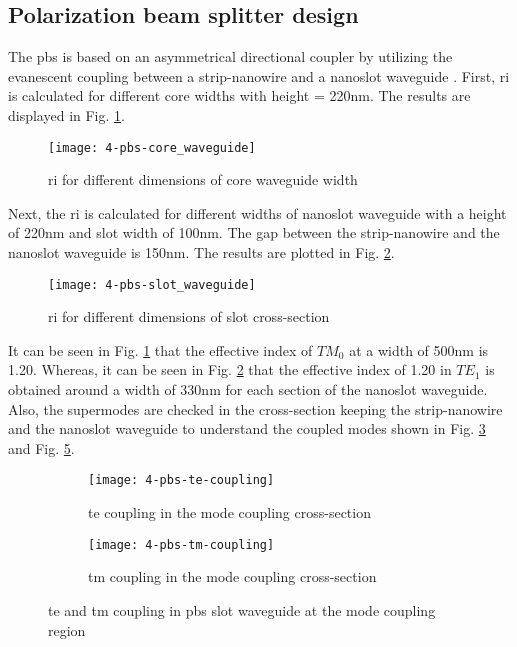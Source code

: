 \documentclass[../report.tex]{subfiles}
\begin{document}
\subsection{Polarization beam splitter design}
The \gls{pbs} is based on an asymmetrical directional coupler by utilizing the evanescent coupling between a strip-nanowire and a nanoslot waveguide \cite{pbs_dai_2011}. First, \gls{ri} is calculated for different core widths with height = 220nm. The results are displayed in Fig. \ref{fig:4_pbs_core_waveguide}.
\begin{figure}[H] %
	\centering
	\texttt{[image: 4-pbs-core\_waveguide]}
	\caption{\gls{ri} for different dimensions of core waveguide width}
	\label{fig:4_pbs_core_waveguide}
\end{figure}
\noindent Next, the \gls{ri} is calculated for different widths of nanoslot waveguide with a height of 220nm and slot width of 100nm. The gap between the strip-nanowire and the nanoslot waveguide is 150nm. The results are plotted in Fig. \ref{fig:4_pbs_slot_waveguide}.
\begin{figure}[H] %
	\centering
	\texttt{[image: 4-pbs-slot\_waveguide]}
	\caption{\gls{ri} for different dimensions of slot cross-section}
	\label{fig:4_pbs_slot_waveguide}
\end{figure}
\noindent It can be seen in Fig. \ref{fig:4_pbs_core_waveguide} that the effective index of $TM_0$ at a width of 500nm is 1.20. Whereas, it can be seen in Fig. \ref{fig:4_pbs_slot_waveguide} that the effective index of 1.20 in $TE_1$ is obtained around a width of 330nm for each section of the nanoslot waveguide. Also, the supermodes are checked in the cross-section keeping the strip-nanowire and the nanoslot waveguide to understand the coupled modes shown in Fig. \ref{fig:4_pbs_te_coupling} and Fig. \ref{fig:4_pbs_tm_coupling}.
\begin{figure}[H] %
	\begin{subfigure}[t]{0.45\textwidth}
		\texttt{[image: 4-pbs-te-coupling]}
		\caption{\gls{te} coupling in the mode coupling cross-section}
		\label{fig:4_pbs_te_coupling}
	\end{subfigure}
	\hfill
	\begin{subfigure}[t]{0.45\textwidth}
		\texttt{[image: 4-pbs-tm-coupling]}
		\caption{\gls{tm} coupling in the mode coupling cross-section}
		\label{fig:4_pbs_tm_coupling}
	\end{subfigure}
	\caption{\gls{te} and \gls{tm} coupling in \gls{pbs} slot waveguide at the mode coupling region}
\end{figure}
\end{document}

